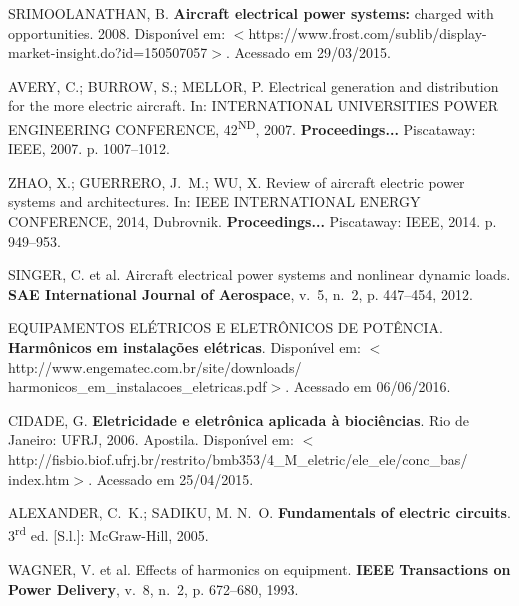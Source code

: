 \begin{thebibliography}{}
{SRIMOOLANATHAN, B. \textbf{Aircraft electrical power systems:} charged with
  opportunities. 2008.
  Dispon{\'\i}vel em:
  $<$https://www.frost.com/sublib/display-market-insight.do?id=150507057$>$.
  Acessado em 29/03/2015.}

{AVERY, C.; BURROW, S.; MELLOR, P. Electrical generation and distribution for
  the more electric aircraft. In:  \uppercase{International
  Universities Power Engineering Conference, 42\textsuperscript{\lowercase{nd}}}, 2007. \textbf{Proceedings...} Piscataway: IEEE, 2007. p.
  1007--1012.}

{ZHAO, X.; GUERRERO, J.~M.; WU, X. Review of aircraft electric power systems
  and architectures. In: \uppercase{IEEE International Energy Conference}, 2014, Dubrovnik. \textbf{Proceedings...}
  Piscataway: IEEE, 2014. p. 949--953.}

{SINGER, C. et al. Aircraft electrical power systems and nonlinear dynamic
  loads.
\textbf{SAE International Journal of Aerospace}, v.~5, n.~2,
  p. 447--454, 2012.}

{EQUIPAMENTOS EL\'ETRICOS E ELETR\^ONICOS DE POT\^ENCIA.
  \textbf{Harm\^onicos em instala\c{c}\~oes el\'etricas}.
  Dispon{\'\i}vel em:
  $<$http://www.engematec.com.br/site/downloads/ harmonicos\_em\_instalacoes\_eletricas.pdf$>$.
  \newblock Acessado em 06/06/2016.}

{CIDADE, G. \textbf{Eletricidade e eletr\^onica aplicada \`a bioci\^encias}.
  Rio de Janeiro: UFRJ, 2006. Apostila.
  Dispon{\'\i}vel em:
  $<$http://fisbio.biof.ufrj.br/restrito/bmb353/4\_M\_eletric/ele\_ele/conc\_bas/ index.htm$>$.
  \newblock Acessado em 25/04/2015.}

{ALEXANDER, C.~K.; SADIKU, M. N.~O. \textbf{Fundamentals of electric
  circuits}. 3\textsuperscript{rd} ed. [S.l.]: McGraw-Hill, 2005.}

{WAGNER, V. et al. Effects of harmonics on equipment.
\textbf{IEEE Transactions on Power Delivery}, v.~8, n.~2, p. 672--680,
  1993.}


\end{thebibliography}
